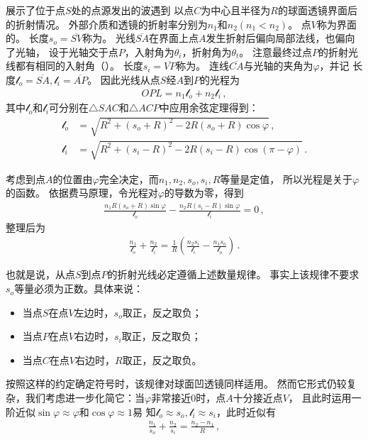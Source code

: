 展示了位于点$S$处的点源发出的波遇到
以点$C$为中心且半径为$R$的球面透镜界面后的折射情况。
外部介质和透镜的折射率分别为$n_1$和$n_2 (n_1<n_2)$。
点$V$称为界面的。
长度$s_o=\overline{SV}$称为。
光线$\overline{SA}$在界面上点$A$发生折射后偏向局部法线，也偏向了光轴，
设于光轴交于点$P$，入射角为$\theta_i$，折射角为$\theta_t$。
注意最终过点$P$的折射光线都有相同的入射角（）。
长度$s_i=\overline{VP}$称为。
连线$\overline{CA}$与光轴的夹角为$\varphi$，并记
长度$\mathcal{l}_o=\overline{SA}, \mathcal{l}_i=\overline{AP}$。
因此光线从点$S$经$A$到$P$的光程为
\begin{align}
    OPL=n_1\mathcal{l}_o+n_2\mathcal{l}_i\, ,
\end{align}
其中$\mathcal{l}_o$和$\mathcal{l}_i$可分别在$\triangle SAC$和$\triangle ACP$中应用余弦定理得到：
\begin{align}
    \mathcal{l}_o & =\sqrt{R^2+(s_o+R)^2-2R(s_o+R)\cos\varphi}\, ,       \\
    \mathcal{l}_i & =\sqrt{R^2+(s_i-R)^2-2R(s_i-R)\cos(\pi-\varphi)}\, .
\end{align}

考虑到点$A$的位置由$\varphi$完全决定，而$n_1, n_2, s_o, s_i, R$等量是定值，
所以光程是关于$\varphi$的函数。
依据费马原理，令光程对$\varphi$的导数为零，得到
\begin{align}
    \frac{n_1R(s_o+R)\sin\varphi}{\mathcal{l}_o}-\frac{n_2R(s_i-R)\sin\varphi}{\mathcal{l}_i}=0\, ,
\end{align}
整理后为
\begin{align}
    \frac{n_1}{\mathcal{l}_o}+\frac{n_2}{\mathcal{l}_i}=\frac{1}{R}\left(\frac{n_2s_i}{\mathcal{l}_i}-\frac{n_1s_o}{\mathcal{l}_o}\right)\, .
\end{align}

也就是说，从点$S$到点$P$的折射光线必定遵循上述数量规律。
事实上该规律不要求$s_o$等量必须为正数。具体来说：
\begin{itemize}
    \item 当点$S$在点$V$左边时，$s_o$取正，反之取负；
    \item 当点$P$在点$V$右边时，$s_i$取正，反之取负；
    \item 当点$C$在点$V$右边时，$R$取正，反之取负。
\end{itemize}

按照这样的约定确定符号时，该规律对球面凹透镜同样适用。
然而它形式仍较复杂，我们考虑进一步化简它：当$\varphi$非常接近0时，点$A$十分接近点$V$，
且此时运用一阶近似$\sin\varphi\approx\varphi$和$\cos\varphi\approx 1$易
知$\mathcal{l}_o\approx s_o, \mathcal{l}_i\approx s_i$，此时近似有
\begin{align}\label{eq:6.24}
    \frac{n_1}{s_o}+\frac{n_2}{s_i}=\frac{n_2-n_1}{R}\, ,
\end{align}

